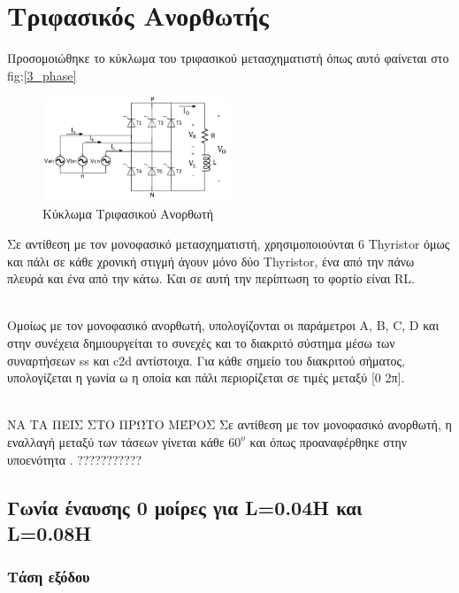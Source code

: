 \section{Τριφασικός Ανορθωτής}

Προσομοιώθηκε το κύκλωμα του τριφασικού μετασχηματιστή όπως αυτό φαίνεται στο fig:\ref{3_phase}
\begin{figure}[h]
	\centering
	\includegraphics[width = 0.5\textwidth]{Images/3_phase.png}
	\caption{Κύκλωμα Τριφασικού Ανορθωτή}
	\label{img:3_phase}
\end{figure}

\noindent
Σε αντίθεση με τον μονοφασικό μετασχηματιστή, χρησιμοποιούνται 6 Thyristor όμως και πάλι σε κάθε χρονική στιγμή άγουν μόνο δύο Thyristor, ένα από την πάνω πλευρά και ένα από την κάτω. Και σε αυτή την περίπτωση το φορτίο είναι RL.

\noindent\\
Ομοίως με τον μονοφασικό ανορθωτή, υπολογίζονται οι παράμετροι Α, Β, C, D και στην συνέχεια δημιουργείται το συνεχές και το διακριτό σύστημα μέσω των συναρτήσεων ss και c2d αντίστοιχα. Για κάθε σημείο του διακριτού σήματος, υπολογίζεται η γωνία ω η οποία και πάλι περιορίζεται σε τιμές μεταξύ [0 2π].

\noindent\\
ΝΑ ΤΑ ΠΕΙΣ ΣΤΟ ΠΡΏΤΟ ΜΈΡΟΣ
Σε αντίθεση με τον μονοφασικό ανορθωτή, η εναλλαγή μεταξύ των τάσεων γίνεται κάθε $60^o$ και όπως προαναφέρθηκε στην υποενότητα .  ???????????

\subsection{Γωνία έναυσης 0 μοίρες για L=0.04Η και L=0.08Η}

\subsubsection{Τάση εξόδου}

